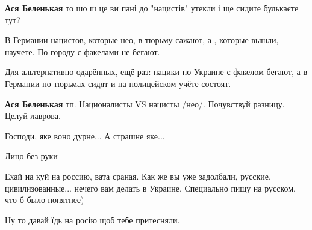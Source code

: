 \begin{itemize}
\begin{itemize}

\textbf{Ася Беленькая} то шо ш це ви пані до "нацистів" утекли і ще сидите булькаєте тут?


В Германии нацистов, которые нео, в тюрьму сажают, а , которые вышли, научете. По городу с факелами не бегают.


Для альтернативно одарённых, ещё раз: нацики по Украине с факелом бегают, а в Германии по тюрьмах сидят и на полицейском учёте состоят.


\textbf{Ася Беленькая} тп. Националисты VS нацисты /нео/. Почувствуй разницу. Целуй лаврова.


\end{itemize}


Господи, яке воно дурне... А страшне яке...


Лицо без руки


Ехай на куй на россию, вата сраная.
Как же вы уже задолбали, русские, цивилизованные... нечего вам делать в Украине.
Специально пишу на русском, что б было понятнее)


Ну то давай їдь на росію щоб тебе притесняли.



\end{itemize}
